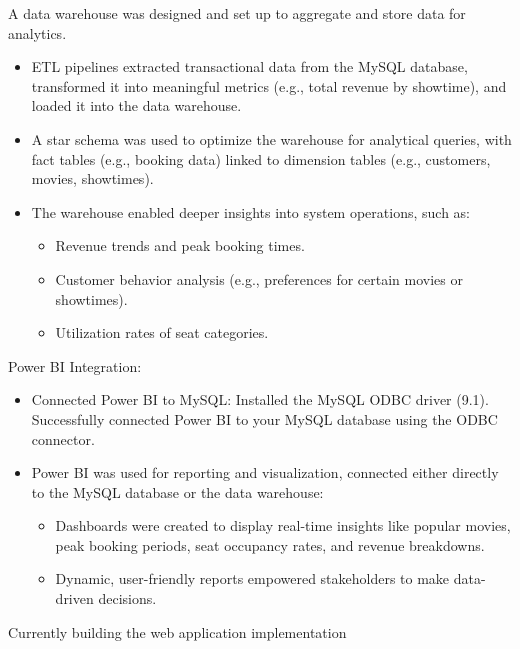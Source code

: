 \documentclass[letterpaper,11pt]{article}
\newcommand{\resumeItem}[1]{
  \item\small{
    {#1 \vspace{-2pt}}
  }
}
\begin{document}
    \resumeItem{A data warehouse was designed and set up to aggregate and store data for analytics.
        \begin{itemize}

            \item ETL pipelines extracted transactional data from the MySQL database, transformed it into meaningful metrics (e.g., total revenue by showtime), and loaded it into the data warehouse.
            \item A star schema was used to optimize the warehouse for analytical queries, with fact tables (e.g., booking data) linked to dimension tables (e.g., customers, movies, showtimes).
            \item The warehouse enabled deeper insights into system operations, such as:
                \begin{itemize}
                    \item Revenue trends and peak booking times.
                    \item Customer behavior analysis (e.g., preferences for certain movies or showtimes).
                    \item Utilization rates of seat categories.
                \end{itemize}
        \end{itemize}
    }
    
 
\pagebreak    
    
   
	\resumeItem{Power BI Integration:
        \begin{itemize}
            \item Connected Power BI to MySQL: Installed the MySQL ODBC driver (9.1). Successfully connected Power BI to your MySQL database using the ODBC connector.
            \item Power BI was used for reporting and visualization, connected either directly to the MySQL database or the data warehouse:
                \begin{itemize}
                    \item Dashboards were created to display real-time insights like popular movies, peak booking periods, seat occupancy rates, and revenue breakdowns.
                    \item Dynamic, user-friendly reports empowered stakeholders to make data-driven decisions.
                \end{itemize}
        \end{itemize}
    }    
    
    
\resumeItem{Currently building the web application implementation}    
    
\end{document}

